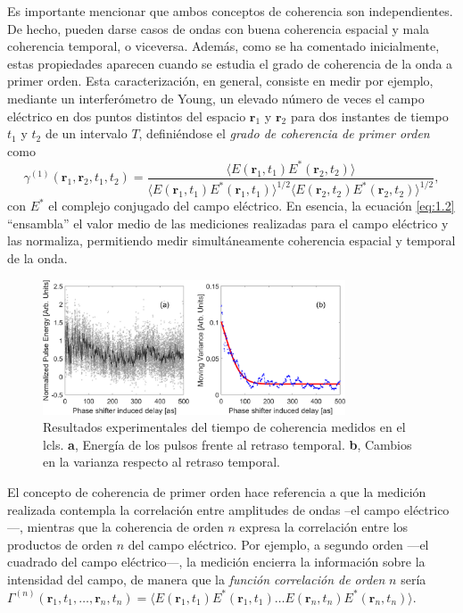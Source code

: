 Es importante mencionar que ambos conceptos de coherencia son independientes. De hecho, pueden darse casos de ondas con buena coherencia espacial y mala coherencia temporal, o viceversa. Además, como se ha comentado inicialmente, estas propiedades aparecen cuando se estudia el grado de coherencia de la onda a primer orden. Esta caracterización, en general, consiste en medir por ejemplo, mediante un interferómetro de Young, un elevado número de veces el campo eléctrico en dos puntos distintos del espacio $\symbf{r}_1$ y $\symbf{r}_2$ para dos instantes de tiempo $t_1$ y $t_2$ de un intervalo $T$, definiéndose el \emph{grado de coherencia de primer orden} como
\begin{equation}\label{eq:1.2}
    \gamma^{(1)}(\symbf{r}_1,\symbf{r}_2,t_1,t_2) = \dfrac{\langle E(\symbf{r}_1,t_1)E^*(\symbf{r}_2,t_2)\rangle}{\langle E(\symbf{r}_1,t_1)E^*(\symbf{r}_1,t_1) \rangle^{1/2} \langle E(\symbf{r}_2,t_2)E^*(\symbf{r}_2,t_2) \rangle^{1/2}},
\end{equation}
con $E^*$ el complejo conjugado del campo eléctrico. En esencia, la ecuación \eqref{eq:1.2} \enquote{ensambla} el valor medio de las mediciones realizadas para el campo eléctrico y las normaliza, permitiendo medir simultáneamente coherencia espacial y temporal de la onda.

\begin{figure}[ht!]
    \centering
    \includegraphics[width=0.8\textwidth]{Figuras/ch1_coher.png}
    \caption{Resultados experimentales del tiempo de coherencia medidos en el \acrshort{lcls}\autocite{zhouAttosecondCoherenceTime2020}. \textbf{a}, Energía de los pulsos frente al retraso temporal. \textbf{b}, Cambios en la varianza respecto al retraso temporal.}
    \label{fig:ch1_coher}
\end{figure}

El concepto de coherencia de primer orden hace referencia a que la medición realizada contempla la correlación entre amplitudes de ondas --el campo eléctrico---, mientras que la coherencia de orden $n$ expresa la correlación entre los productos de orden $n$ del campo eléctrico. Por ejemplo, a segundo orden ---el cuadrado del campo eléctrico---, la medición encierra la información sobre la intensidad del campo, de manera que la \emph{función correlación de orden} $n$ sería $\Gamma^{(n)}(\symbf{r}_1,t_1,\ldots,\symbf{r}_n,t_n) = \langle E(\symbf{r}_1,t_1)E^*(\symbf{r}_1,t_1)\ldots E(\symbf{r}_n,t_n)E^*(\symbf{r}_n,t_n)\rangle$.

